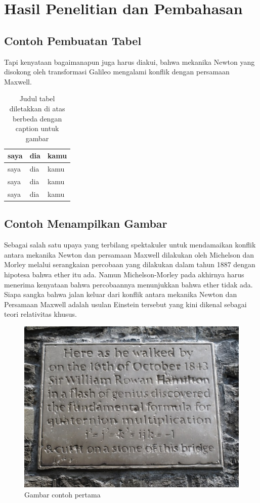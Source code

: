 \chapter{Hasil Penelitian dan Pembahasan}


\section{Contoh Pembuatan Tabel}

Tapi kenyataan bagaimanapun juga harus diakui, bahwa mekanika Newton yang disokong oleh transformasi Galileo mengalami konflik dengan persamaan Maxwell. 

\begin{table}[h]
\centering
\caption{Judul tabel diletakkan di atas berbeda dengan caption untuk gambar}
\label{tab:tabelpertama}
\begin{tabular}{|l|l|l|}
\hline
saya & dia & kamu \\
\hline
saya & dia & kamu \\
saya & dia & kamu \\
saya & dia & kamu \\
\hline
\end{tabular}

\end{table}

\section{Contoh Menampilkan Gambar}
Sebagai salah satu upaya yang terbilang spektakuler untuk mendamaikan konflik antara mekanika Newton dan persamaan Maxwell dilakukan oleh Michelson dan Morley melalui serangkaian percobaan yang dilakukan dalam tahun 1887 dengan hipotesa bahwa ether itu ada. Namun Michelson-Morley pada akhirnya harus menerima kenyataan bahwa percobaannya menunjukkan bahwa ether tidak ada. Siapa sangka bahwa jalan keluar dari konflik antara mekanika Newton dan Persamaan Maxwell adalah usulan Einstein tersebut yang kini dikenal sebagai teori relativitas khusus.

\begin{figure}[h]
\centering
\includegraphics[scale=0.8]{gambarcontoh.jpg}
\caption{Gambar contoh pertama}
\label{gbr:gambarpertama}
\end{figure}


